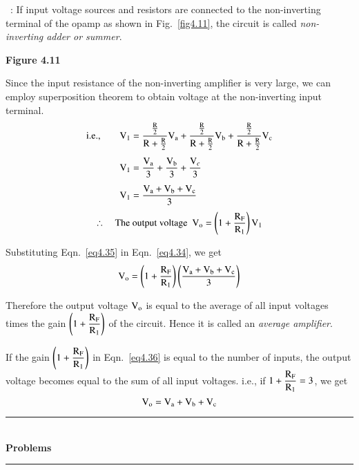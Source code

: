 ~: If input voltage sources and resistors are connected to the non-inverting terminal of the opamp as shown in Fig.~\ref{fig4.11}, the circuit is called {\em non-inverting adder or summer}.
\begin{center}
{\bf Figure 4.11}
\end{center}

Since the input resistance of the non-inverting amplifier is very large, we can employ superposition theorem to obtain voltage at the non-inverting input terminal. 
\begin{align}
\text{i.e.,}\qquad \textrm{V}_{1} &= \frac{\frac{\textrm{R}}{2}}{\textrm{R}+\frac{\textrm{R}}{2}}\textrm{V}_{\textrm{a}}+\frac{\frac{\textrm{R}}{2}}{\textrm{R}+\frac{\textrm{R}}{2}}\textrm{V}_{\textrm{b}}+\frac{\frac{\textrm{R}}{2}}{\textrm{R}+\frac{\textrm{R}}{2}}\textrm{V}_{\textrm{c}}\notag\\[4pt]
\textrm{V}_{1} &= \frac{\textrm{V}_{\textrm{a}}}{3}+\frac{\textrm{V}_{\textrm{b}}}{3}+\frac{\textrm{V}_{c}}{3}\notag\\[4pt]
\textrm{V}_{1} &= \frac{\textrm{V}_{\textrm{a}}+\textrm{V}_{\textrm{b}}+\textrm{V}_{\textrm{c}}}{3}\label{eq4.34}
\end{align}
\begin{equation}
\therefore\quad \text{The output voltage~ } \textrm{V}_{\textrm{o}}=\left(1+\frac{\textrm{R}_{\textrm{F}}}{\textrm{R}_{1}}\right)\textrm{V}_{1}\label{eq4.35}
\end{equation}

Substituting Eqn.~\eqref{eq4.35} in Eqn.~\eqref{eq4.34}, we get
\begin{equation}
\textrm{V}_{\textrm{o}}=\left(1+\frac{\textrm{R}_{\textrm{F}}}{\textrm{R}_{1}}\right)\left(\frac{\textrm{V}_{\textrm{a}}+\textrm{V}_{\textrm{b}}+\textrm{V}_{\textrm{c}}}{3}\right)\label{eq4.36}
\end{equation}

Therefore the output voltage $\textrm{V}_{\textrm{o}}$ is equal to the average of all input voltages times the gain $\left(1+\dfrac{\textrm{R}_{\textrm{F}}}{\textrm{R}_{1}}\right)$ of the circuit. Hence it is called an {\em average amplifier}.

If the gain $\left(1+\dfrac{\textrm{R}_{\textrm{F}}}{\textrm{R}_{1}}\right)$ in Eqn.~\eqref{eq4.36} is equal to the number of inputs, the output voltage becomes equal to the sum of all input voltages. i.e., if $1+\dfrac{\textrm{R}_{\textrm{F}}}{\textrm{R}_{1}}=3$, we get
\begin{equation}
\textrm{V}_{\textrm{o}}=\textrm{V}_{\textrm{a}}+\textrm{V}_{\textrm{b}}+\textrm{V}_{\textrm{c}}\label{eq4.37}
\end{equation}

\begin{center}
\rule{4cm}{1pt}\\
{\bf\Large Problems}\\[-3pt]
\rule{4cm}{1pt}
\end{center}

